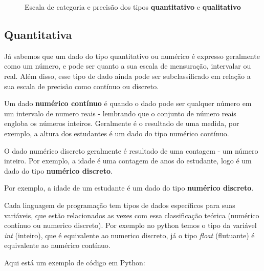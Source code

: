 \documentclass[a4paper,12pt]{book}
\begin{document}
\begin{figure}
	\caption{Escala de categoria e precisão dos tipos \textbf{quantitativo} e \textbf{qualitativo}}
	\centering
	\label{fig:mensuracao}
\end{figure}



\subsection{Quantitativa}

	Já sabemos que um dado do tipo quantitativo ou numérico é expresso geralmente como um número, e pode ser quanto a sua escala de mensuração, intervalar ou real. Além disso, esse tipo de dado ainda pode ser subclassificado em relação a sua escala de precisão como contínuo ou discreto.

	Um dado \textbf{numérico contínuo} é quando o dado pode ser qualquer número em um intervalo de numero reais - lembrando que o conjunto de número reais engloba os números inteiros. Geralmente é o resultado de uma medida, por exemplo, a altura dos estudantes é um dado do tipo numérico contínuo.

	O dado numérico discreto geralmente é resultado de uma contagem - um número inteiro. Por exemplo, a idade é uma contagem de anos do estudante, logo é um dado do tipo \textbf{numérico discreto}.

	Por exemplo, a idade de um estudante é um dado do tipo \textbf{numérico discreto}.

	Cada linguagem de programação tem tipos de dados específicos para suas variáveis, que estão relacionados as vezes com essa classificação teórica (numérico contínuo ou numerico discreto). Por exemplo no python temos o tipo da variável \textit{int} (inteiro), que é equivalente ao numerico discreto, já o tipo \textit{float} (flutuante) é equivalente ao numérico contínuo.

	Aqui está um exemplo de código em Python:
\end{document}
